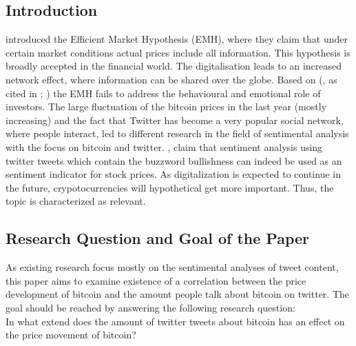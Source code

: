 \documentclass[a4paper,american,12pt]{article}
\begin{document}
\begin{spacing}{1.2}
\cleardoublepage{}
\section{Introduction}
\label{sec:intro}
\textcite[p.~388]{malkiel1970efficient} introduced the Efficient Market Hypothesis (EMH), where they claim that under certain market conditions actual prices include all information. This hypothesis is broadly accepted in the financial world. The digitalisation leads to an increased network effect, where information can be shared over the globe. Based on \citeauthor{mao2015quantifying} (\citeyear[][p.~3]{mao2015quantifying}, as cited in \cite[][pp.~175--195]{shiller2015irrational}; \cite[][pp.~279]{kahneman2013prospect}) the EMH fails to address the behavioural and emotional role of investors. The large fluctuation of the bitcoin prices in the last year (mostly increasing) and the fact that Twitter has become a very popular social network, where people interact, led to different research in the field of sentimental analysis with the focus on bitcoin and twitter. \textcite[p.~18]{mao2015quantifying}, claim that sentiment analysis using twitter tweets which contain the buzzword bullishness can indeed be used as an sentiment indicator for stock prices. As digitalization is expected to continue in the future, crypotocurrencies will hypothetical get more important. Thus, the topic is characterized as relevant.

\subsection{Research Question and Goal of the Paper}
\label{sec:ResearchQandGoal}
As existing research focus mostly on the sentimental analyses of tweet content, this paper aims to examine existence of a correlation between the price development of bitcoin and the amount people talk about bitcoin on twitter. The goal should be reached by answering the following research question: \\
In what extend does the amount of twitter tweets about bitcoin has an effect on the price movement of bitcoin?


\end{spacing}
\end{document}

